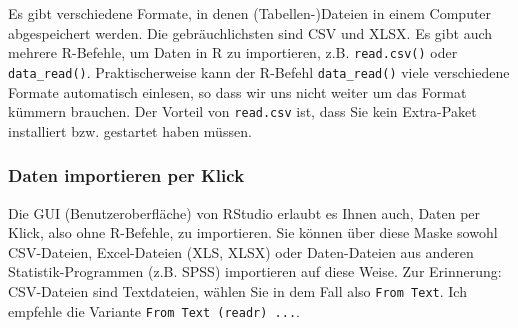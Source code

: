 \documentclass[
  letterpaper,
]{scrbook}
\theoremstyle{definition}
\theoremstyle{definition}
\theoremstyle{definition}
\theoremstyle{remark}
\begin{document}
\begin{figure}


\caption{\label{fig-upload-to-posit-cloud}}

\end{figure}%

\begin{tcolorbox}[enhanced jigsaw, colbacktitle=quarto-callout-note-color!10!white, toptitle=1mm, colframe=quarto-callout-note-color-frame, breakable, toprule=.15mm, bottomrule=.15mm, bottomtitle=1mm, left=2mm, opacitybacktitle=0.6, colback=white, arc=.35mm, coltitle=black, title=\textcolor{quarto-callout-note-color}{\faInfo}\hspace{0.5em}{Hinweis}, opacityback=0, rightrule=.15mm, leftrule=.75mm, titlerule=0mm]

Es gibt verschiedene Formate, in denen (Tabellen-)Dateien in einem
Computer abgespeichert werden. Die gebräuchlichsten sind CSV und XLSX.
Es gibt auch mehrere R-Befehle, um Daten in R zu importieren, z.B.
\texttt{read.csv()} oder \texttt{data\_read()}. Praktischerweise kann
der R-Befehl \texttt{data\_read()} viele verschiedene Formate
automatisch einlesen, so dass wir uns nicht weiter um das Format kümmern
brauchen. Der Vorteil von \texttt{read.csv} ist, dass Sie kein
Extra-Paket installiert bzw. gestartet haben müssen.

\end{tcolorbox}

\subsubsection{Daten importieren per
Klick}\label{daten-importieren-per-klick}

Die GUI (Benutzeroberfläche) von RStudio erlaubt es Ihnen auch, Daten
per Klick, also ohne R-Befehle, zu importieren. Sie können über diese
Maske sowohl CSV-Dateien, Excel-Dateien (XLS, XLSX) oder Daten-Dateien
aus anderen Statistik-Programmen (z.B. SPSS) importieren auf diese
Weise. Zur Erinnerung: CSV-Dateien sind Textdateien, wählen Sie in dem
Fall also \texttt{From\ Text}. Ich empfehle die Variante
\texttt{From\ Text\ (readr)\ ...}.
\end{document}
